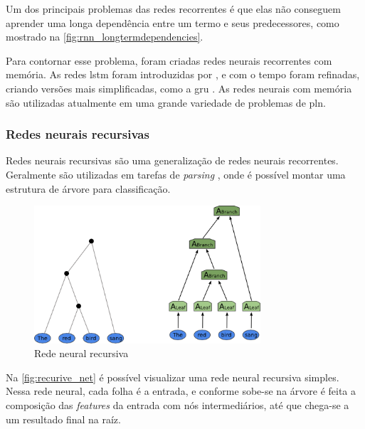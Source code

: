 Um dos principais problemas das redes recorrentes é que elas não conseguem aprender uma longa dependência entre um termo e seus predecessores, como mostrado na \autoref{fig:rnn_longtermdependencies}. 

Para contornar esse problema, foram criadas redes neurais recorrentes com memória. As redes \ac{lstm} foram introduzidas por , e com o tempo foram refinadas, criando versões mais simplificadas, como a \ac{gru} \cite{cho2014learning}. As redes neurais com memória são utilizadas atualmente em uma grande variedade de problemas de \ac{pln}.


\subsubsection{Redes neurais recursivas}

Redes neurais recursivas são uma generalização de redes neurais recorrentes. Geralmente são utilizadas em tarefas de \textit{parsing} \cite{socher2011parsing, socher2010learning}, onde é possível montar uma estrutura de árvore para classificação. 

\begin{figure}[!htb]
\centering
\caption{Rede neural recursiva} \label{fig:recurive_net}
\includegraphics[width=0.75\textwidth]{img/recurive_net.png}
\end{figure}

Na \autoref{fig:recurive_net} é possível visualizar uma rede neural recursiva simples. Nessa rede neural, cada folha é a entrada, e conforme sobe-se na árvore é feita a composição das \textit{features} da entrada com nós intermediários, até que chega-se a um resultado final na raíz.


